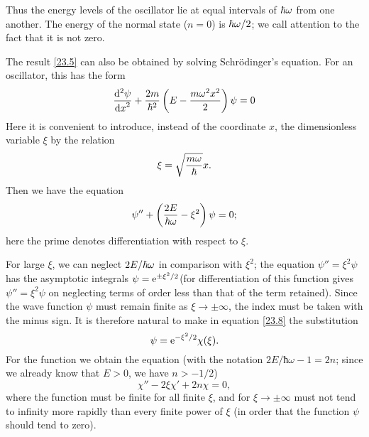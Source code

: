 Thus the energy levels of the oscillator lie at equal intervals of $ \hbar\omega $ from one another. The energy of the normal state ($ n = 0 $) is $ \hbar\omega/2 $; we call attention to the fact that it is not zero.

The result \eqref{23.5} can also be obtained by solving Schr\"odinger's equation. For an oscillator, this has the form
\begin{equation}\label{23.6}
\frac{\mathrm{d}^2\psi}{{\mathrm{d} x}^2}+\frac{2m}{\hbar^2}\left( E-\frac{m\omega^2x^2}{2}\right)\psi=0
\end{equation}
Here it is convenient to introduce, instead of the coordinate $ x $, the dimensionless variable $\xi$ by the relation
\begin{equation}\label{23.7}
\xi=\sqrt{\frac{m\omega}{\hbar}}x.
\end{equation}
Then we have the equation
\begin{equation}\label{23.8}
\psi''+\left(\frac{2E}{\hbar\omega}-\xi^2 \right)\psi=0;
\end{equation}
here the prime denotes differentiation with respect to $\xi$.

For large $\xi$, we can neglect $ 2E/\hbar\omega $ in comparison with $\xi^2$; the equation $ \psi''= \xi^2\psi $ has the asymptotic integrals $ \psi=\mathrm{e}^{\pm\xi^2/2} $(for differentiation of this function gives $ \psi''= \xi^2\psi $ on neglecting terms of order less than that of the term retained). Since the wave function $\psi$ must remain finite as $\xi\to\pm\infty$, the index must be taken with the minus sign. It is therefore natural to make in equation \eqref{23.8} the substitution
\begin{equation}\label{23.9}
\psi=\mathrm{e}^{-\xi^2/2}\chi(\xi).
\end{equation}
For the function we obtain the equation (with the notation $ 2E/ħω −1 = 2n $; since we already know that $ E > 0 $, we have $ n > -1/2 $)
\begin{equation}\label{23.10}
\chi''-2\xi\chi'+2n\chi=0,
\end{equation}
where the function must be finite for all finite $\xi$, and for $\xi\to\pm\infty$ must not tend to infinity more rapidly than every finite power of $\xi$ (in order that the function $\psi$ should tend to zero).

